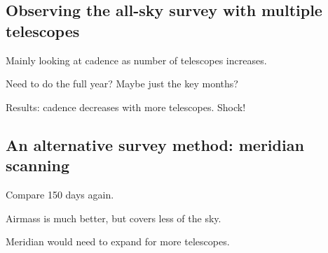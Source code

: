 \begin{colsection}
\begin{colsection}
\end{colsection}


\subsection{Observing the all-sky survey with multiple telescopes}
\label{sec:allsky_sim_multiscope}
\begin{colsection}

Mainly looking at cadence as number of telescopes increases.

Need to do the full year? Maybe just the key months?

Results: cadence decreases with more telescopes. Shock!

\end{colsection}


\subsection{An alternative survey method: meridian scanning}
\label{sec:allsky_sim_meridian}
\begin{colsection}

Compare 150 days again.

Airmass is much better, but covers less of the sky.

Meridian would need to expand for more telescopes.

\end{colsection}


\end{colsection}

